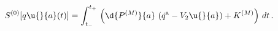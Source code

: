 \begin{equation*}
  S^{(0)}[q\u{}{a}(t)] = \int_{t_-}^{t_+} \, \left(\d{P^{(M)}}{a}\,\left(
\dot{q}^{{\mathrm{a}}}- V_{2}\u{}{a}\right) + K^{(M)}\right)\,dt\,.
\end{equation*}

